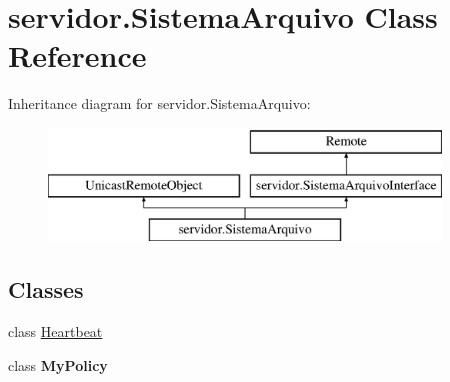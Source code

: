 \hypertarget{classservidor_1_1_sistema_arquivo}{\section{servidor.\+Sistema\+Arquivo Class Reference}
\label{classservidor_1_1_sistema_arquivo}
}
Inheritance diagram for servidor.\+Sistema\+Arquivo\+:\begin{figure}[H]
\begin{center}
\leavevmode
\includegraphics[height=3.000000cm]{classservidor_1_1_sistema_arquivo}
\end{center}
\end{figure}
\subsection*{Classes}
\begin{DoxyCompactItemize}
\item 
class \hyperlink{classservidor_1_1_sistema_arquivo_1_1_heartbeat}{Heartbeat}
\item 
class {\bfseries My\+Policy}
\end{DoxyCompactItemize}
